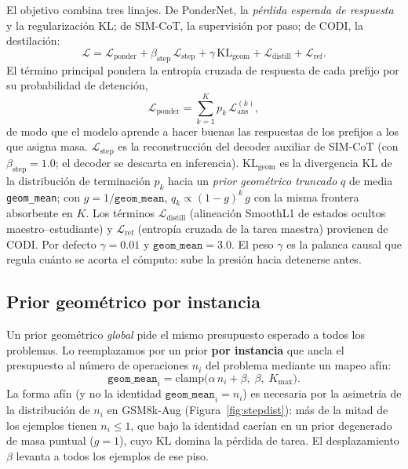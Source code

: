 \documentclass[11pt]{article}
\begin{document}
El objetivo combina tres linajes. De PonderNet, la \emph{pérdida esperada de respuesta} y la regularización KL; de SIM-CoT, la supervisión por paso; de CODI, la destilación:
\begin{equation}
  \mathcal{L} = \mathcal{L}_{\text{ponder}}
  + \beta_{\text{step}}\,\mathcal{L}_{\text{step}}
  + \gamma\,\mathrm{KL}_{\text{geom}}
  + \mathcal{L}_{\text{distill}}
  + \mathcal{L}_{\text{ref}} .
  \label{eq:loss}
\end{equation}
El término principal pondera la entropía cruzada de respuesta de cada prefijo por su probabilidad de detención,
\begin{equation}
  \mathcal{L}_{\text{ponder}}
  = \sum_{k=1}^{K} p_k \, \mathcal{L}_{\text{ans}}^{(k)} ,
  \label{eq:lponder}
\end{equation}
de modo que el modelo aprende a hacer buenas las respuestas de los prefijos a los que asigna masa. $\mathcal{L}_{\text{step}}$ es la reconstrucción del decoder auxiliar de SIM-CoT (con $\beta_{\text{step}}=1.0$; el decoder se descarta en inferencia). $\mathrm{KL}_{\text{geom}}$ es la divergencia KL de la distribución de terminación $p_k$ hacia un \emph{prior geométrico truncado} $q$ de media \texttt{geom\_mean}; con $g = 1/\texttt{geom\_mean}$, $q_k \propto (1-g)^{k}\,g$ con la misma frontera absorbente en $K$. Los términos $\mathcal{L}_{\text{distill}}$ (alineación SmoothL1 de estados ocultos maestro--estudiante) y $\mathcal{L}_{\text{ref}}$ (entropía cruzada de la tarea maestra) provienen de CODI. Por defecto $\gamma=0.01$ y $\texttt{geom\_mean}=3.0$. El peso $\gamma$ es la palanca causal que regula cuánto se acorta el cómputo: sube la presión hacia detenerse antes.

\subsection{Prior geométrico por instancia}
\label{sec:prior}

Un prior geométrico \emph{global} pide el mismo presupuesto esperado a todos los problemas. Lo reemplazamos por un prior \textbf{por instancia} que ancla el presupuesto al número de operaciones $n_i$ del problema mediante un mapeo afín:
\begin{equation}
  \texttt{geom\_mean}_i = \mathrm{clamp}\big(\alpha\, n_i + \beta,\; \beta,\; K_{\max}\big).
  \label{eq:adaptiveprior}
\end{equation}
La forma afín (y no la identidad $\texttt{geom\_mean}_i = n_i$) es necesaria por la asimetría de la distribución de $n_i$ en GSM8k-Aug (Figura~\ref{fig:stepdist}): más de la mitad de los ejemplos tienen $n_i \le 1$, que bajo la identidad caerían en un prior degenerado de masa puntual ($g=1$), cuyo KL domina la pérdida de tarea. El desplazamiento $\beta$ levanta a todos los ejemplos de ese piso.
\end{document}
